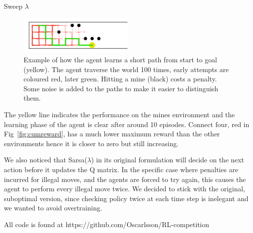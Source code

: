 Sweep $\lambda$
\begin{figure}[h]
    \centering
    \includegraphics[width=0.5\textwidth]{../data/minPlot.png}
    \caption{Example of how the agent learns a short path from start to goal (yellow). The agent traverse the world 100 times, early attempts are coloured red, later green. Hitting a mine (black) costs a penalty. Some noise is added to the paths to make it easier to distinguish them.}
    \label{fig:awesome_image}
\end{figure}

The yellow line indicates the performance on the mines environment and the learning phase of the agent is clear after around 10 episodes. Connect four, red in Fig~\ref{fig:cumreward}, has a much lower maximum reward than the other environments hence it is closer to zero but still increasing.

We also noticed that Sarsa($\lambda$) in its original formulation will decide on the next action before it updates the Q matrix. In the specific case where penalties are incurred for illegal moves, and the agents are forced to try again, this causes the agent to perform every illegal move twice. We decided to stick with the original, suboptimal version, since checking policy twice at each time step is inelegant and we wanted to avoid overtraining.

All code is found at https://github.com/Oscarlsson/RL-competition
